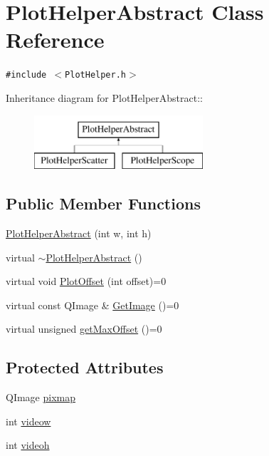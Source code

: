 \hypertarget{class_plot_helper_abstract}{
\section{PlotHelperAbstract Class Reference}
\label{class_plot_helper_abstract}
}
{\tt \#include $<$PlotHelper.h$>$}

Inheritance diagram for PlotHelperAbstract::\begin{figure}[H]
\begin{center}
\leavevmode
\includegraphics[height=2cm]{class_plot_helper_abstract}
\end{center}
\end{figure}
\subsection*{Public Member Functions}
\begin{CompactItemize}
\item 
\hyperlink{class_plot_helper_abstract_5ce8f74da753d9b322667da23dfcadca}{PlotHelperAbstract} (int w, int h)
\item 
virtual \hyperlink{class_plot_helper_abstract_2cec5e5f0f338763d67b4c08cfa0418f}{$\sim$PlotHelperAbstract} ()
\item 
virtual void \hyperlink{class_plot_helper_abstract_f6e3d62673650c86bee9191cd8ca3800}{PlotOffset} (int offset)=0
\item 
virtual const QImage \& \hyperlink{class_plot_helper_abstract_63305b07bebbbaa71cedbf8e05d05dfa}{GetImage} ()=0
\item 
virtual unsigned \hyperlink{class_plot_helper_abstract_099ed5350c367a7afbd957fe3d777eab}{getMaxOffset} ()=0
\end{CompactItemize}
\subsection*{Protected Attributes}
\begin{CompactItemize}
\item 
QImage \hyperlink{class_plot_helper_abstract_15631f94b85196d39757d3ab3a05b4ab}{pixmap}
\item 
int \hyperlink{class_plot_helper_abstract_0fe7a92c0cf8e8b309713a9b8eebdedb}{videow}
\item 
int \hyperlink{class_plot_helper_abstract_52f3eb0c2d21e58fc311f08b5fe9dc3f}{videoh}
\end{CompactItemize}


